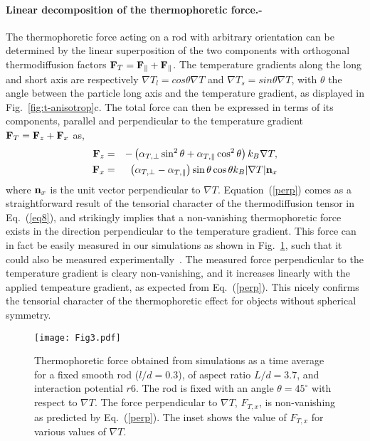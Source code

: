 \documentclass[aps,pre,twocolumn,showpacs,superscriptaddress]{revtex4-1}
\begin{document}
\paragraph{Linear decomposition of the thermophoretic force.-}
The thermophoretic force acting on a rod with arbitrary orientation
can be determined by the linear superposition of the two components
with orthogonal thermodiffusion factors ${\bf F}_T= {\bf F}_\parallel+{\bf
  F}_\|$. The temperature gradients along the long and short axis are
respectively $\nabla T_l=cos\theta\nabla T$ and $\nabla
T_s=sin\theta\nabla T$, with $\theta$ the angle between the particle
long axis and the temperature gradient, as displayed in
Fig.~\ref{fig:t-anisotrop}c. The total force can then be expressed in
terms of its components, parallel and perpendicular to the temperature
gradient ${\bf F}_T= {\bf F}_z+{\bf F}_x$ as,
\begin{eqnarray}
{\bf F}_{z}&=&-\left(\alpha_{T,\perp}\sin^{2}\theta+\alpha_{T,\|}\cos^{2}\theta\right)k_{B}\nabla
T,\label{para}\\
{\bf F}_{x}&=&\left(\alpha_{T,\perp}-\alpha_{T,\|}\right)\sin\theta\cos\theta
k_{B}|\nabla T|{\bf n}_{x}\label{perp} 
\end{eqnarray}
where ${\bf n}_{x}$ is the unit vector perpendicular to $\nabla T$.
Equation~(\ref{perp}) comes as a straightforward result of the
tensorial character of the thermodiffusion tensor in Eq.~(\ref{eq8}),
and strikingly implies that a non-vanishing thermophoretic force
exists in the direction perpendicular to the temperature
gradient. This force can in fact be easily measured in our simulations
as shown in Fig.~\ref{fig:ft45}, such that it could also be measured
experimentally~\cite{jiang09,helden15}.  The measured force
perpendicular to the temperature gradient is cleary non-vanishing, and
it increases linearly with the applied tempeature gradient, as
expected from Eq.~(\ref{perp}). This nicely confirms the tensorial
character of the thermophoretic effect for objects without spherical
symmetry.
\begin{figure}[h!]
\texttt{[image: Fig3.pdf]}
\caption{Thermophoretic force obtained from simulations as a time
  average for a fixed smooth rod ($l/d= 0.3$), of aspect ratio 
  $L/d=3.7$, and interaction potential $r6$.  The rod is fixed with 
  an angle $\theta =45^\circ$ with respect to $\nabla T$. 
  The force perpendicular to $\nabla T$, $F_{T,x}$, is non-vanishing as 
  predicted by Eq.~(\ref{perp}). The inset shows the value of $F_{T,x}$ 
  for various values of $\nabla T$.
  \label{fig:ft45}}
\end{figure}
\end{document}

